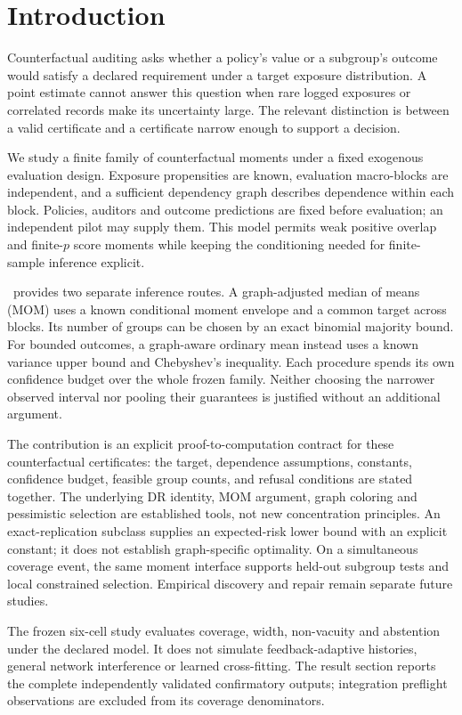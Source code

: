 \section{Introduction}
\label{sec:intro}
Counterfactual auditing asks whether a policy's value or a subgroup's outcome would satisfy a declared requirement under a target exposure distribution. A point estimate cannot answer this question when rare logged exposures or correlated records make its uncertainty large. The relevant distinction is between a valid certificate and a certificate narrow enough to support a decision.

We study a finite family of counterfactual moments under a fixed exogenous evaluation design. Exposure propensities are known, evaluation macro-blocks are independent, and a sufficient dependency graph describes dependence within each block. Policies, auditors and outcome predictions are fixed before evaluation; an independent pilot may supply them. This model permits weak positive overlap and finite-$p$ score moments while keeping the conditioning needed for finite-sample inference explicit.

\COMET\ provides two separate inference routes. A graph-adjusted median of means (MOM) uses a known conditional moment envelope and a common target across blocks. Its number of groups can be chosen by an exact binomial majority bound. For bounded outcomes, a graph-aware ordinary mean instead uses a known variance upper bound and Chebyshev's inequality. Each procedure spends its own confidence budget over the whole frozen family. Neither choosing the narrower observed interval nor pooling their guarantees is justified without an additional argument.

The contribution is an explicit proof-to-computation contract for these counterfactual certificates: the target, dependence assumptions, constants, confidence budget, feasible group counts, and refusal conditions are stated together. The underlying DR identity, MOM argument, graph coloring and pessimistic selection are established tools, not new concentration principles. An exact-replication subclass supplies an expected-risk lower bound with an explicit constant; it does not establish graph-specific optimality. On a simultaneous coverage event, the same moment interface supports held-out subgroup tests and local constrained selection. Empirical discovery and repair remain separate future studies.

The frozen six-cell study evaluates coverage, width, non-vacuity and abstention under the declared model. It does not simulate feedback-adaptive histories, general network interference or learned cross-fitting. The result section reports the complete independently validated confirmatory outputs; integration preflight observations are excluded from its coverage denominators.
